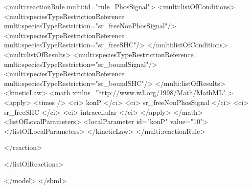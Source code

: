 \begin{example}
        <multi:reactionRule multi:id="rule_PhosSignal">
          <multi:listOfConditions>
            <multi:speciesTypeRestrictionReference multi:speciesTypeRestriction="sr_freeNonPhosSignal"/>
            <multi:speciesTypeRestrictionReference multi:speciesTypeRestriction="sr_freeSHC"/>
          </multi:listOfConditions>
          <multi:listOfResults>
            <multi:speciesTypeRestrictionReference multi:speciesTypeRestriction="sr_boundSignal"/>
            <multi:speciesTypeRestrictionReference multi:speciesTypeRestriction="sr_boundSHC"/>
          </multi:listOfResults>
            <kineticLaw>
              <math xmlns="http://www.w3.org/1998/Math/MathML" >
                <apply>
                  <times />
                  <ci> konP </ci>
                  <ci> sr_freeNonPhosSignal </ci>
                  <ci> sr_freeSHC </ci>
                  <ci> intracellular </ci>
                </apply>
              </math>
              <listOfLocalParameters>
                <localParameter id="konP" value="10">
              </listOfLocalParameters>
            </kineticLaw>
          </multi:reactionRule>

      </reaction>

    </listOfReactions>

  </model>
</sbml>
\end{example}
